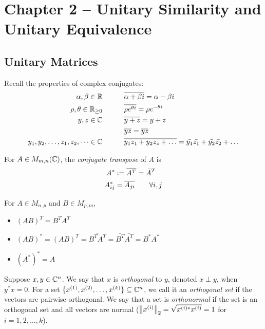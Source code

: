 \section{Chapter 2 -- Unitary Similarity and Unitary Equivalence}

\subsection{Unitary Matrices}
Recall the properties of complex conjugates:
\begin{align*}
    \alpha, \beta \in \mathbb R &\quad \quad \quad \overline{\alpha+\beta i} = \alpha - \beta i \\
    \rho, \theta \in \mathbb R_{\geq 0} &\quad \quad \quad \overline{\rho e^{\theta i}} = \rho e^{-\theta i} \\
    y, z \in \mathbb C &\quad \quad \quad \overline{y+z} = \Bar{y} + \Bar{z} \\
                &\quad \quad \quad \overline{yz} = \overline{y}\overline{z} \\
    y_1, y_2, \dots, z_1, z_2, \dots \in \mathbb C &\quad \quad \quad \overline{y_1z_1 + y_2z_z + \dots} = \bar{y_1}\bar{z_1} + \bar{y_2}\bar{z_2} + \dots
\end{align*}

\begin{definition}
\label{def:conjugate-transpose}
For $A \in M_{m,n}(\mathbb C)$, the \textit{conjugate transpose} of $A$ is 
\begin{align*}
A^* &\vcentcolon= \overline{A^T} = \Bar{A}^T \\
A^*_{ij} &= \overline{A_{ji}} \quad \quad \forall i,j
\end{align*}
\end{definition}

\begin{note*}
For $A \in M_{n,p}$ and $B \in M_{p,m}$,
\begin{itemize}
    \item $(AB)^T = B^T A^T$
    \item $(AB)^* = \overline{(AB)^T} = \overline{B^T A^T} = \bar{B^T} \bar{A^T} = B^* A^*$
    \item $(A^*)^* = A$
\end{itemize}
\end{note*}

\begin{definition}
Suppose $x, y \in \mathbb C^n$. We say that $x$ is \textit{orthogonal} to $y$, denoted $x \perp y$, when $y^*x = 0$. For a set $\{x^{(1)}, x^{(2)}, \dots, x^{(k)}\} \subseteq \mathbb C^n$, we call it an \textit{orthogonal set} if the vectors are pairwise orthogonal. We say that a set is \textit{orthonormal} if the set is an orthogonal set and all vectors are normal ($\left\lVert x^{(i)}\right\rVert_2 = \sqrt{x^{(i)*}x^{(i)}} = 1$ for $i = 1, 2, \dots, k$).
\end{definition}

